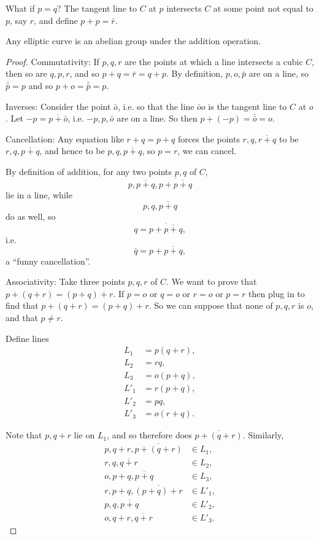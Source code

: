 What if \(p=q\)?
The tangent line to \(C\) at \(p\) intersects \(C\) at some point not equal to \(p\), say \(r\), and define \(p+p=\bar{r}\).

\begin{theorem}
Any elliptic curve is an abelian group under the addition operation.
\end{theorem}
\begin{proof}
Commutativity: If \(p,q,r\) are the points at which a line intersects a cubic \(C\), then so are \(q,p,r\), and so \(p+q=\bar{r}=q+p\).
By definition, \(p,o,\bar{p}\) are on a line, so \(\bar{\bar{p}}=p\) and so \(p+o=\bar{\bar{p}}=p\).

Inverses: Consider the point \(\bar{o}\), i.e. so that the line \(\bar{o}o\) is the tangent line to \(C\) at \(o\).
Let \(-p=\overline{p+\bar{o}}\), i.e. \(-p,p,\bar{o}\) are on a line.
So then \(p+(-p)=\bar{\bar{o}}=o\).

Cancellation: Any equation like \(r+q=p+q\) forces the points \(r,q,\overline{r+q}\) to be \(r,q,\overline{p+q}\), and hence to be \(p,q,\overline{p+q}\), so \(p=r\), we can cancel.

By definition of addition, for any two points \(p,q\) of \(C\),
\[
p,\overline{p+q},\overline{p+\overline{p+q}}
\]
lie in a line, while 
\[
p,q,\overline{p+q}
\]
do as well, so 
\[
q=\overline{p+\overline{p+q}},
\]
i.e.
\[
\bar{q}=p+\overline{p+q},
\]
a ``funny cancellation''.

Associativity: Take three points \(p,q,r\) of \(C\).
We want to prove that \(p+(q+r)=(p+q)+r\).
If \(p=o\) or \(q=o\) or \(r=o\) or \(p=r\) then plug in to find that \(p+(q+r)=(p+q)+r\).
So we can suppose that none of \(p,q,r\) is \(o\), and that \(p\ne r\).

Define lines
\begin{align*}
L_1 &= p(q+r), \\
L_2 &= rq, \\
L_3 &= o(p+q), \\
L'_1 &= r(p+q), \\
L'_2 &= pq, \\
L'_3 &= o(r+q).
\end{align*}

Note that \(p,q+r\) lie on \(L_1\), and so therefore does \(\overline{p+(q+r)}\).
Similarly,
\begin{align*}
p,q+r,\overline{p+(q+r)} & \in L_1, \\
r,q,\overline{q+r} & \in L_2, \\
o,p+q,\overline{p+q} & \in L_3, \\
r,p+q,\overline{(p+q)+r} & \in L'_1, \\
p,q,\overline{p+q} & \in L'_2, \\
o,q+r,\overline{q+r} & \in L'_3.
\end{align*}


\end{proof}
